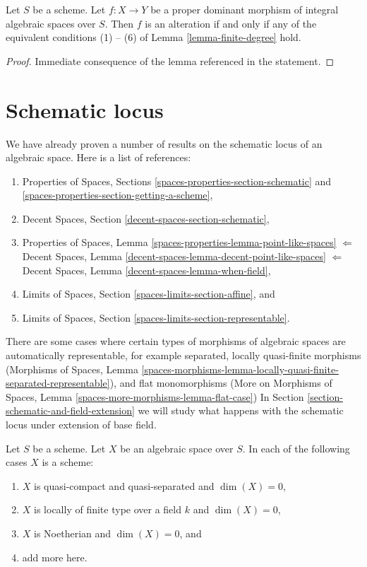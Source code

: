 \begin{lemma}
\label{lemma-alteration-generically-finite}
Let $S$ be a scheme. Let $f : X \to Y$ be a proper dominant morphism of
integral algebraic spaces over $S$. Then $f$ is an alteration
if and only if any of the equivalent conditions (1) -- (6) of
Lemma \ref{lemma-finite-degree} hold.
\end{lemma}

\begin{proof}
Immediate consequence of the lemma referenced in the statement.
\end{proof}





\section{Schematic locus}
\label{section-schematic}

\noindent
We have already proven a number of results on the schematic locus
of an algebraic space. Here is a list of references:
\begin{enumerate}
\item Properties of Spaces, Sections
\ref{spaces-properties-section-schematic} and
\ref{spaces-properties-section-getting-a-scheme},
\item Decent Spaces, Section \ref{decent-spaces-section-schematic},
\item Properties of Spaces, Lemma
\ref{spaces-properties-lemma-point-like-spaces}
$\Leftarrow$
Decent Spaces, Lemma \ref{decent-spaces-lemma-decent-point-like-spaces}
$\Leftarrow$
Decent Spaces, Lemma \ref{decent-spaces-lemma-when-field},
\item Limits of Spaces, Section \ref{spaces-limits-section-affine}, and
\item Limits of Spaces, Section \ref{spaces-limits-section-representable}.
\end{enumerate}
There are some cases where certain types of morphisms of algebraic spaces
are automatically representable, for example
separated, locally quasi-finite morphisms (Morphisms of Spaces, Lemma
\ref{spaces-morphisms-lemma-locally-quasi-finite-separated-representable}),
and flat monomorphisms (More on Morphisms of Spaces, Lemma
\ref{spaces-more-morphisms-lemma-flat-case})
In Section \ref{section-schematic-and-field-extension}
we will study what happens with the schematic
locus under extension of base field.

\begin{lemma}
\label{lemma-locally-finite-type-dim-zero}
Let $S$ be a scheme. Let $X$ be an algebraic space over $S$.
In each of the following cases $X$ is a scheme:
\begin{enumerate}
\item $X$ is quasi-compact and quasi-separated and $\dim(X) = 0$,
\item $X$ is locally of finite type over a field $k$ and $\dim(X) = 0$,
\item $X$ is Noetherian and $\dim(X) = 0$, and
\item add more here.
\end{enumerate}
\end{lemma}

